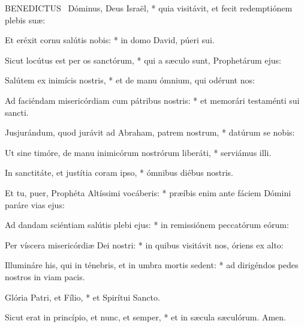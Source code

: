 





\lettrine[lines=2]{B}{ENEDICTUS} \textdagger\ Dóminus, Deus Israël, * quia visitávit, et fecit redemptiónem plebis suæ:

Et eréxit cornu salútis nobis: * in domo David, púeri sui.

Sicut locútus est per os sanctórum, * qui a sæculo sunt, Prophetárum ejus:

Salútem ex inimícis nostris, * et de manu ómnium, qui odérunt nos:

Ad faciéndam misericórdiam cum pátribus nostris: * et memorári testaménti sui sancti.

Jusjurándum, quod jurávit ad Abraham, patrem nostrum, * datúrum se nobis:

Ut sine timóre, de manu inimicórum nostrórum liberáti, * serviámus illi.

In sanctitáte, et justítia coram ipso, * ómnibus diébus nostris.

Et tu, puer, Prophéta Altíssimi vocáberis: * præíbis enim ante fáciem Dómini paráre vias ejus:

Ad dandam sciéntiam salútis plebi ejus: * in remissiónem peccatórum eórum:

Per víscera misericórdiæ Dei nostri: * in quibus visitávit nos, óriens ex alto:

Illumináre his, qui in ténebris, et in umbra mortis sedent: * ad dirigéndos pedes nostros in viam pacis.

Glória Patri, et Fílio, * et Spirítui Sancto.

Sicut erat in princípio, et nunc, et semper, * et in sæcula sæculórum. Amen.



